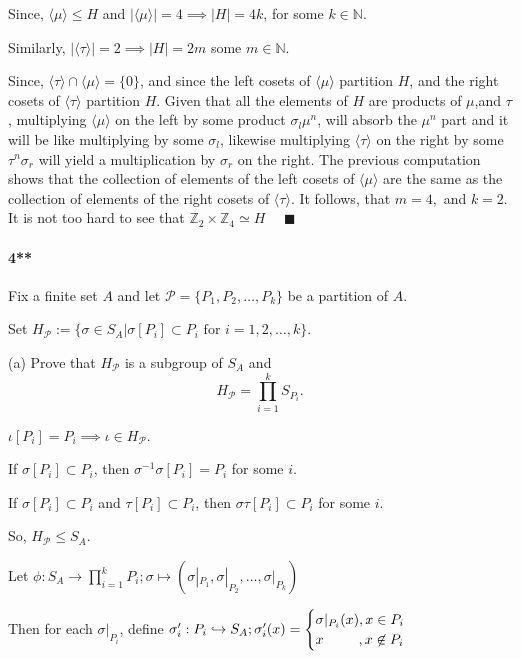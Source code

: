 \documentclass{article}
\newcommand\N{\mathbb{N}}
\newcommand\Z{\mathbb{Z}}
\begin{document}

Since, $\langle \mu \rangle \leq H$ and $|\langle \mu \rangle| =
4 \implies |H| = 4k$, for some $k \in \N.$

Similarly, $|\langle \tau \rangle| = 2 \implies |H| = 2m$
some $m\in \N$.

Since, $\langle \tau \rangle\cap \langle \mu \rangle = \{0\}$, and
since the left cosets of $\langle  \mu\rangle$ partition
$H$, and the right cosets of $\langle  \tau\rangle$ partition
$H$. Given that all the elements of $H$ are products of $\mu$,and
$\tau$, multiplying $\langle \mu \rangle$ on the left by some product
$\sigma_l\mu^n$, will absorb the $\mu^n$ part and it will be like
multiplying by some $\sigma_l$, likewise multiplying $\langle \tau
\rangle$ on the right by some $\tau^n\sigma_r$ will yield a
multiplication by $\sigma_r$ on the right. The previous computation
shows that the collection of elements of the left cosets of $\langle
\mu \rangle$ are the same as the collection of elements of the right
cosets of $\langle \tau \rangle$. It
follows, that $m=4,$ and $k = 2.$ It is not too hard to see that
$\Z_2\times \Z_4 \simeq H$ $\quad \blacksquare$


\paragraph{4**} Fix a finite set $A$ and let $\mathcal{P} =
\{P_1,P_2,\dots,P_k\}$ be a partition of $A$.

Set $H_{\mathcal{P}} := \{\sigma \in S_A| \sigma[P_i] \subset P_i\text{ for } i= 1,2,\dots,k\}.$

(a) Prove that $H_{\mathcal{P}}$ is a subgroup of $S_A$ and
\[H_{\mathcal{P}} = \prod_{i=1}^k S_{P_i} .\]


$\iota[P_i] = P_i \implies \iota \in H_{\mathcal{P}}$.

If $\sigma[P_i]\subset P_i$, then $\sigma^{-1}\sigma[P_i] = P_i$
for some $i$.

If $\sigma[P_i] \subset P_i$ and $\tau[P_i] \subset P_i$, then $\sigma\tau[P_i]\subset
P_i$ for some $i$.

So, $H_{\mathcal{P}}\leq S_A$.

Let $\phi:S_A \rightarrow \prod_{i=1}^k P_i; \sigma\mapsto
(\sigma|_{P_1}, \sigma|_{P_2}, \dots, \sigma|_{P_k})$


Then for each $\sigma|_{P_i}$, define $\sigma_{i}^{\prime}: P_i
\hookrightarrow{} S_A; \sigma_i^\prime
(x)= \begin{cases}\sigma|_{P_i}(x), x \in P_i\\ x\quad\enskip\quad, x\not\in P_i\end{cases}$
\end{document}
